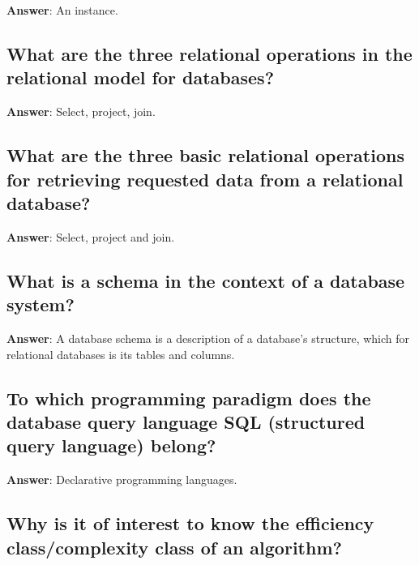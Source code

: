 \documentclass[a4paper,11pt,oneside]{article}
\begin{document}
\begin{sloppypar}
\label{q:295:sa:en:True}

\textbf{Answer}: An instance.



\subsection{What are the three relational operations in the relational model for databases?}

\label{q:296:sa:en:True}

\textbf{Answer}: Select, project, join.



\subsection{What are the three basic relational operations for retrieving requested data from a relational database?}

\label{q:297:sa:en:True}

\textbf{Answer}: Select, project and join.



\subsection{What is a schema in the context of a database system?}

\label{q:298:sa:en:True}

\textbf{Answer}: A database schema is a description of a database's structure, which for relational databases is its tables and columns.



\subsection{To which programming paradigm does the database query language SQL (structured query language) belong?}

\label{q:299:sa:en:True}

\textbf{Answer}: Declarative programming languages.



\subsection{Why is it of interest to know the efficiency class/complexity class of an algorithm?}

\label{q:300:sa:en:True}


\end{sloppypar}
\end{document}
